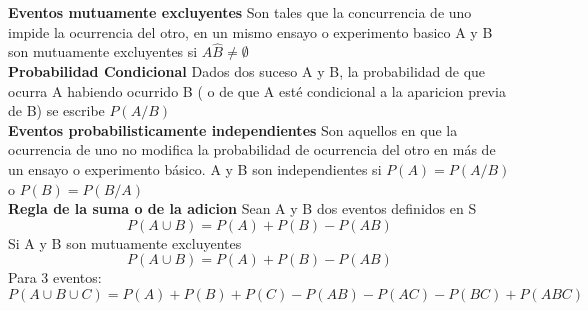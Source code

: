 \documentclass[10pt,a4paper]{article}
\begin{document}
\textbf{Eventos mutuamente excluyentes}
Son tales que la concurrencia de uno impide la ocurrencia del otro, en un mismo ensayo o experimento basico A y B son mutuamente excluyentes si $A\hat B \neq \emptyset$\\

\textbf{Probabilidad Condicional} Dados dos suceso A y B, la probabilidad de que ocurra A habiendo ocurrido B ( o de que A esté condicional a la aparicion previa de B) se escribe $P(A/B)$\\

\textbf{Eventos probabilisticamente independientes} Son aquellos en que la ocurrencia de uno no modifica la probabilidad de ocurrencia del otro en más de un ensayo o experimento básico. A y B son independientes si $P(A)=P(A/B)$ o $P(B)=P(B/A)$\\

\textbf{Regla de la suma o de la adicion} Sean A y B dos eventos definidos en S
\begin{equation}
	P(A\cup B)=P(A)+P(B)-P(AB)
\end{equation}
Si A y B son mutuamente excluyentes
\begin{equation}
	P(A\cup B)=P(A)+P(B)-P(AB)
\end{equation}
Para 3 eventos:
\begin{equation}
	P(A\cup B\cup C)=P(A)+P(B)+P(C)-P(AB)-P(AC)-P(BC)+P(ABC)
\end{equation}
\end{document}
